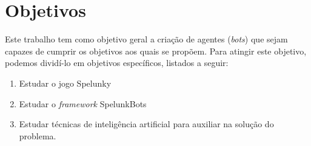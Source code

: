 \chapter{\label{chap:objectives}Objetivos}
Este trabalho tem como objetivo geral a criação de agentes (\textit{bots}) que
sejam capazes de cumprir os objetivos aos quais se propõem. Para atingir este
objetivo, podemos dividí-lo em objetivos específicos, listados a seguir:

\begin{enumerate}
    \item Estudar o jogo Spelunky 

    \item Estudar o \textit{framework} SpelunkBots

    \item Estudar técnicas de inteligência artificial para auxiliar na solução do problema.
\end{enumerate}
